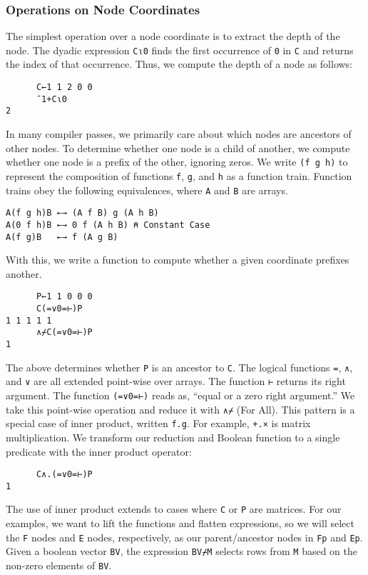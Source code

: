 \documentclass[numbers,9pt]{sigplanconf}
\begin{document}
\subsubsection{Operations on Node Coordinates}

The simplest operation over a node coordinate is to extract the depth
of the node.
The dyadic expression \verb;C⍳0; finds the first occurrence of \verb;0;
in \verb;C; and returns the index of that occurrence.
Thus, we compute the depth of a node as follows:

\begin{verbatim}
      C←1 1 2 0 0
      ¯1+C⍳0
2
\end{verbatim}

\noindent
In many compiler passes, we primarily care about which nodes are ancestors 
of other nodes. To determine whether one node is a child of another, we compute 
whether one node is a prefix of the other, ignoring zeros.
We write \verb;(f g h); to represent the composition of functions \verb;f;, \verb;g;,
and \verb;h; as a function train.
Function trains obey the following equivalences, where \verb;A; and \verb;B;
are arrays.

\begin{verbatim}
A(f g h)B ←→ (A f B) g (A h B)
A(0 f h)B ←→ 0 f (A h B) ⍝ Constant Case
A(f g)B   ←→ f (A g B)
\end{verbatim}

\noindent
With this, we write a function to compute whether a given coordinate prefixes 
another.

\begin{verbatim}
      P←1 1 0 0 0
      C(=∨0=⊢)P
1 1 1 1 1
      ∧⌿C(=∨0=⊢)P
1
\end{verbatim}

\noindent
The above determines whether \verb;P; is an ancestor to \verb;C;.
The logical functions \verb;=;, \verb;∧;, and \verb;∨; are all extended 
point-wise over arrays.
The function \verb;⊢; returns its right argument.
The function \verb;(=∨0=⊢); reads as, ``equal or a zero right argument.'' 
We take this point-wise operation and reduce it with \verb;∧⌿; (For All).
This pattern is a special case of inner product, written \verb;f.g;. 
For example, \verb;+.×; is matrix multiplication. We transform our reduction and 
Boolean function to a single predicate with the inner product operator:
\begin{verbatim}
      C∧.(=∨0=⊢)P
1
\end{verbatim}

The use of inner product extends to cases where \verb;C; or \verb;P; are matrices.
For our examples, we want to lift the functions and flatten expressions, so we 
will select the \verb;F; nodes and \verb;E; nodes, respectively, as our 
parent/ancestor nodes in \verb;Fp; and \verb;Ep;. Given a boolean vector 
\verb;BV;, the expression \verb;BV⌿M; selects rows from \verb;M; based on the 
non-zero elements of \verb;BV;.
\end{document}
